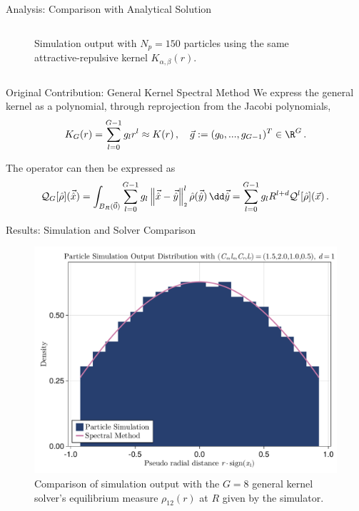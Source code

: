 \documentclass[aspectratio=169, hyperref={colorlinks=true}]{beamer}
\begin{document}
\begin{frame}{Analysis: Comparison with Analytical Solution}
\begin{columns}[t]
\begin{column}{0.4\textwidth}
\begin{figure}[H]
          \caption[Comparison with analytical solutions and error]{Simulation output with $N_p = 150$ particles using the same attractive-repulsive kernel $K_{\alpha,\beta}(r)$.}
        \end{figure}
      \end{column}
    \end{columns}
  \end{frame}

  \begin{frame}{Original Contribution: General Kernel Spectral Method}
    We express the general kernel as a polynomial, through reprojection from the Jacobi polynomials,
    \begin{equation}
      K_G(r) = \sum_{l=0}^{G-1} g_l r^l \approx K(r)\,,\quad \vec{g} := ({g}_0, ..., {g}_{G-1})^T \in \R^G\,.
      \label{eq:monomial-expansion}
    \end{equation}

    The operator can then be expressed as
    \begin{equation*}
      \mathcal{Q}_G[\hat{\rho}](\hatvec{x})
      = \int_{B_R(\vec{0})} \sum_{l=0}^{G-1} g_l \norm{\hatvec{x}-\hatvec{y}}^l \hat{\rho}(\hatvec{y}) \,\dd\hatvec{y}
      = \sum_{l=0}^{G-1} g_l R^{l+d} \mathcal{Q}^l[\hat{\rho}](\vec{x})\,.
    \end{equation*}
  \end{frame}

  \begin{frame}{Results: Simulation and Solver Comparison}
    \begin{figure}[H]
      \centering
      \includegraphics[width=0.58\linewidth]{results/morse/simulation-solver-comparison.pdf}
      \caption[Comparison of histogram and spectral method solution]{Comparison of simulation output with the $G = 8$ general kernel solver's equilibrium measure $\rho_{12}(r)$ at $R$ given by the simulator.}
      \label{fig:simulation-solver-comparison}
    \end{figure}
  \end{frame}
\end{document}
